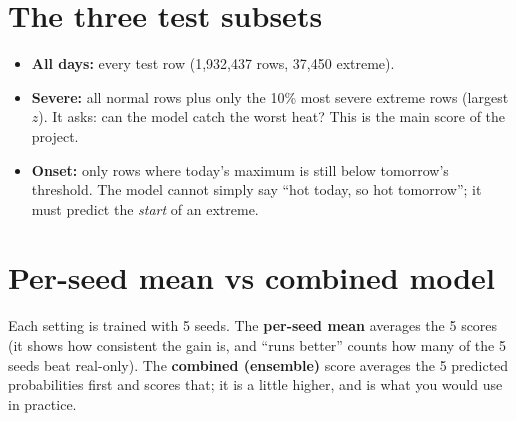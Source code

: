 \section{The three test subsets}
\begin{itemize}
  \item \textbf{All days:} every test row (1,932,437 rows, 37,450 extreme).
  \item \textbf{Severe:} all normal rows plus only the 10\% most severe extreme rows (largest $z$). It asks: can the
        model catch the worst heat? This is the main score of the project.
  \item \textbf{Onset:} only rows where today's maximum is still below tomorrow's threshold. The model cannot simply
        say ``hot today, so hot tomorrow''; it must predict the \emph{start} of an extreme.
\end{itemize}

\section{Per-seed mean vs combined model}
Each setting is trained with 5 seeds. The \textbf{per-seed mean} averages the 5 scores (it shows how consistent the
gain is, and ``runs better'' counts how many of the 5 seeds beat real-only). The \textbf{combined (ensemble)} score
averages the 5 predicted probabilities first and scores that; it is a little higher, and is what you would use in
practice.



